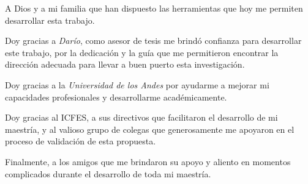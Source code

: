 \begin{acknowledgements}

A Dios y a mi familia que han dispuesto las herramientas que hoy me permiten desarrollar esta trabajo.

Doy gracias a \textit{Dar\'io}, como asesor de tesis me brind\'o confianza para desarrollar este trabajo, por la dedicaci\'on y la gu\'ia que me permitieron encontrar la direcci\'on adecuada para llevar a buen puerto esta investigaci\'on.

Doy gracias a la \textit{Universidad de los Andes} por ayudarme a mejorar mi capacidades profesionales y desarrollarme acad\'emicamente.

Doy gracias al ICFES, a sus directivos que facilitaron el desarrollo de mi maestr\'ia, y al valioso grupo de colegas que generosamente me apoyaron en el proceso de validaci\'on de esta propuesta.

Finalmente, a los amigos que me brindaron su apoyo y aliento en momentos complicados durante el desarrollo de toda mi maestr\'ia.

\end{acknowledgements}